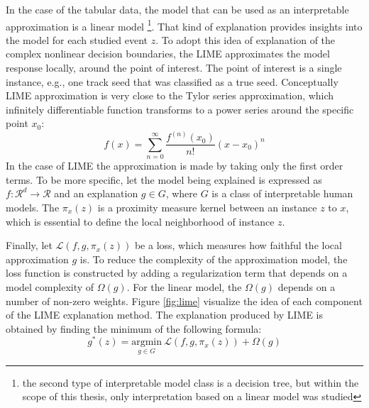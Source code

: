 In the case of the tabular data, the model that can be used as an interpretable approximation is a linear model \footnote{the second type of interpretable model class is a decision tree, but within the scope of this thesis, only interpretation based on a linear model was studied}. 
That kind of explanation provides insights into the model for each studied event $z$. To adopt this idea of explanation of the complex nonlinear decision boundaries, the LIME approximates the model response locally, around the point of interest. The point of interest is a single instance, e.g., one track seed that was classified as a true seed.  
Conceptually LIME approximation is very close to the Tylor series approximation, which infinitely differentiable function transforms to a power series around the specific point $x_0$: 
\begin{equation}
    f(x) = \sum_{n=0}^{\infty} \frac{f^{(n)}(x_0)}{n!} (x-x_0)^n
\end{equation}
In the case of LIME the approximation is made by taking only the first order terms.  
To be more specific, let the model being explained is expressed as $f: \mathcal{R}^{d}\rightarrow  \mathcal{R} $ and an explanation $g \in G$, where $G$ is a class of interpretable human models. The $\pi_x(z)$ is a proximity measure kernel between an instance $z$ to $x$, which is essential to define the local neighborhood of instance $z$.

Finally, let $\mathcal{L}(f,g,\pi_x(z))$ be a loss, which measures how faithful the local approximation $g$ is. 
To reduce the complexity of the approximation model, the loss function is constructed by adding a regularization term that depends on a model complexity of $\Omega(g)$. For the linear model, the $\Omega(g)$ depends on a number of non-zero weights. Figure \ref{fig:lime} visualize the idea of each component of the LIME explanation method. 
The explanation produced by LIME is obtained by finding the minimum of the following formula: 
\begin{equation} \label{eq:LIME}
    g^*(z) = \underset{{g \in G}}{\mathrm{argmin}} ~ \mathcal{L}(f,g,\pi_x(z)) + \Omega(g)
\end{equation}


